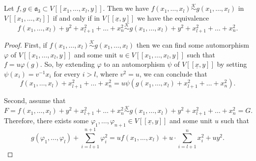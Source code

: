 \documentclass[10pt,a4paper]{amsart}
\newcommand{\equivk}{\overset{\mathcal{K}}{\sim}}
\begin{document}
\begin{lemma}\label{prop:rank_good_def}
    Let $f, g \in \mathfrak{a}_3 \subset V[[x_1, \dots, x_l,y]]$. Then we have  $f\left(x_1, \dots, x_l\right) \equivk  g\left(x_1, \dots, x_l\right)$ in $V[[x_1, \dots, x_l]]$ if and only if in $V[[\underline{x},y]]$ we have the equivalence $$f\left(x_1, \dots, x_l\right)+y^2+x_{l+1}^2 + \dots + x_n^2 \equivk  g\left(x_1, \dots, x_l\right)+y^2+x_{l+1}^2 + \dots + x_n^2.$$  
\end{lemma}

\begin{proof}
    First, if $f\left(x_1, \dots, x_l\right) \equivk g\left(x_1, \dots, x_l \right)$ then we can find some automorphism $\varphi$ of $V[[x_1, \dots, x_l, y]]$ and some unit $u \in V[[x_1, \dots, x_l, y]]$ such that $f = u \varphi(g)$. So, by extending $\varphi$ to an automorphism $\psi$ of $V[[\underline{x},y]]$ by setting $\psi \left(x_i\right)=v^{-1} x_i$ for every $i>l$, where $v^2=u$, we can conclude that 
    \begin{equation*}
        f\left(x_1, \dots, x_l\right) +x_{l+1}^2 + \dots + x_n^2  = u \psi\left(g\left(x_1, \dots, x_l\right) +x_{l+1}^2 + \dots + x_n^2\right). 
    \end{equation*}
    

    \noindent Second, assume that 
    \begin{equation*}
        F=f\left(x_1, \dots, x_l \right)+ y^2+ x_{l+1}^2 + \dots + x_n^2 \equivk g\left(x_1, \dots, x_l\right)+y^2 +x_{l+1}^2 + \dots + x_n^2=G.
    \end{equation*}
    Therefore, there exists some $\varphi_1, \dots, \varphi_{n+1} \in V[[\underline{x},y]]$ and some unit $u$ such that 
    \begin{equation*}
         g\left(\varphi_1, \dots, \varphi_{l}\right) + \sum_{i=l+1}^{n+1} \varphi_i^2 =   uf\left(x_1, \dots, x_l\right) + u\cdot \sum_{i=l+1}^n x_i^2 +uy^2.
    \end{equation*}
    

\end{proof}
\end{document}
